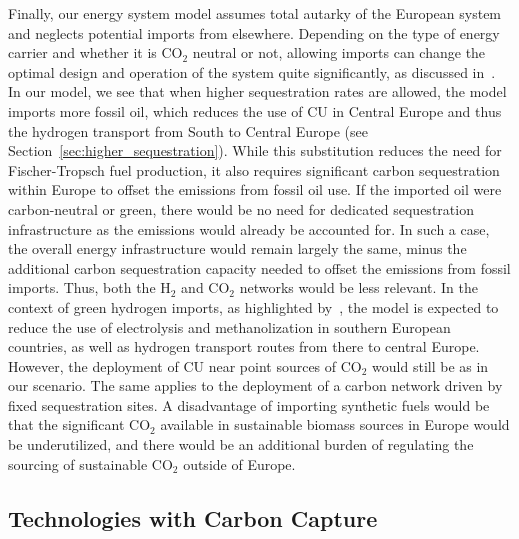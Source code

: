 \documentclass[twocolumn]{article}
\newcommand{\carbon}{CO$_2$}
\newcommand{\hydrogen}{H$_2$}
\begin{document}
Finally, our energy system model assumes total autarky of the European system and neglects potential imports from elsewhere. Depending on the type of energy carrier and whether it is \carbon{} neutral or not, allowing imports can change the optimal design and operation of the system quite significantly, as discussed in~\cite{neumannEnergyImportsInfrastructure2024}. In our model, we see that when higher sequestration rates are allowed, the model imports more fossil oil, which reduces the use of CU in Central Europe and thus the hydrogen transport from South to Central Europe (see Section~\ref{sec:higher_sequestration}). While this substitution reduces the need for Fischer-Tropsch fuel production, it also requires significant carbon sequestration within Europe to offset the emissions from fossil oil use. If the imported oil were carbon-neutral or green, there would be no need for dedicated sequestration infrastructure as the emissions would already be accounted for. In such a case, the overall energy infrastructure would remain largely the same, minus the additional carbon sequestration capacity needed to offset the emissions from fossil imports. Thus, both the \hydrogen{} and \carbon{} networks would be less relevant.
In the context of green hydrogen imports, as highlighted by~\cite{neumannEnergyImportsInfrastructure2024}, the model is expected to reduce the use of electrolysis and methanolization in southern European countries, as well as hydrogen transport routes from there to central Europe. However, the deployment of CU near point sources of \carbon{} would still be as in our scenario. The same applies to the deployment of a carbon network driven by fixed sequestration sites.
A disadvantage of importing synthetic fuels would be that the significant \carbon{} available in sustainable biomass sources in Europe would be underutilized, and there would be an additional burden of regulating the sourcing of sustainable \carbon{} outside of Europe.


\subsection{Technologies with Carbon Capture}
\end{document}

